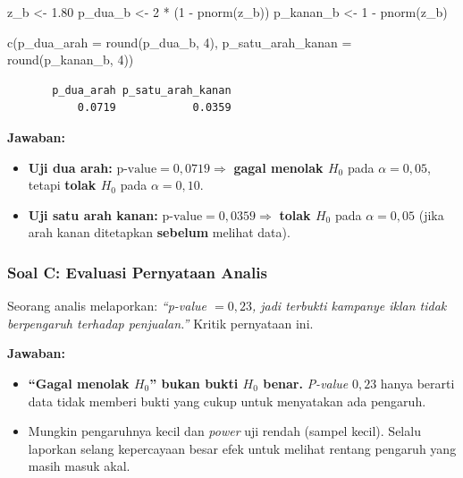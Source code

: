 \documentclass[
  indonesian,
  letterpaper,
]{book}
\newenvironment{Shaded}{\begin{snugshade}}{\end{snugshade}}
\newcommand{\AttributeTok}[1]{\textcolor[rgb]{0.40,0.45,0.13}{#1}}
\newcommand{\DecValTok}[1]{\textcolor[rgb]{0.68,0.00,0.00}{#1}}
\newcommand{\FloatTok}[1]{\textcolor[rgb]{0.68,0.00,0.00}{#1}}
\newcommand{\FunctionTok}[1]{\textcolor[rgb]{0.28,0.35,0.67}{#1}}
\newcommand{\NormalTok}[1]{\textcolor[rgb]{0.00,0.23,0.31}{#1}}
\newcommand{\OtherTok}[1]{\textcolor[rgb]{0.00,0.23,0.31}{#1}}
\newcommand{\SpecialCharTok}[1]{\textcolor[rgb]{0.37,0.37,0.37}{#1}}
\providecommand{\tightlist}{%
  \setlength{\itemsep}{0pt}\setlength{\parskip}{0pt}}
\begin{document}
\begin{Shaded}
\begin{Highlighting}[]
\NormalTok{z\_b }\OtherTok{\textless{}{-}} \FloatTok{1.80}
\NormalTok{p\_dua\_b }\OtherTok{\textless{}{-}} \DecValTok{2} \SpecialCharTok{*}\NormalTok{ (}\DecValTok{1} \SpecialCharTok{{-}} \FunctionTok{pnorm}\NormalTok{(z\_b))}
\NormalTok{p\_kanan\_b }\OtherTok{\textless{}{-}} \DecValTok{1} \SpecialCharTok{{-}} \FunctionTok{pnorm}\NormalTok{(z\_b)}

\FunctionTok{c}\NormalTok{(}\AttributeTok{p\_dua\_arah =} \FunctionTok{round}\NormalTok{(p\_dua\_b, }\DecValTok{4}\NormalTok{),}
  \AttributeTok{p\_satu\_arah\_kanan =} \FunctionTok{round}\NormalTok{(p\_kanan\_b, }\DecValTok{4}\NormalTok{))}
\end{Highlighting}
\end{Shaded}

\begin{verbatim}
       p_dua_arah p_satu_arah_kanan 
           0.0719            0.0359 
\end{verbatim}

\textbf{Jawaban:}

\begin{itemize}
\tightlist
\item
  \textbf{Uji dua arah:} \(\text{p-value} = 0{,}0719 \Rightarrow\)
  \textbf{gagal menolak \(H_0\)} pada \(\alpha = 0{,}05\), tetapi
  \textbf{tolak \(H_0\)} pada \(\alpha = 0{,}10\).
\item
  \textbf{Uji satu arah kanan:}
  \(\text{p-value} = 0{,}0359 \Rightarrow\) \textbf{tolak \(H_0\)} pada
  \(\alpha = 0{,}05\) (jika arah kanan ditetapkan \textbf{sebelum}
  melihat data).
\end{itemize}

\subsubsection{Soal C: Evaluasi Pernyataan
Analis}\label{soal-c-evaluasi-pernyataan-analis}

Seorang analis melaporkan: \emph{``p-value \(= 0{,}23\), jadi terbukti
kampanye iklan tidak berpengaruh terhadap penjualan.''} Kritik
pernyataan ini.

\textbf{Jawaban:}

\begin{itemize}
\tightlist
\item
  \textbf{``Gagal menolak \(H_0\)'' bukan bukti \(H_0\) benar.}
  \emph{P-value} \(0{,}23\) hanya berarti data tidak memberi bukti yang
  cukup untuk menyatakan ada pengaruh.
\item
  Mungkin pengaruhnya kecil dan \emph{power} uji rendah (sampel kecil).
  Selalu laporkan selang kepercayaan besar efek untuk melihat rentang
  pengaruh yang masih masuk akal.
\end{itemize}
\end{document}
